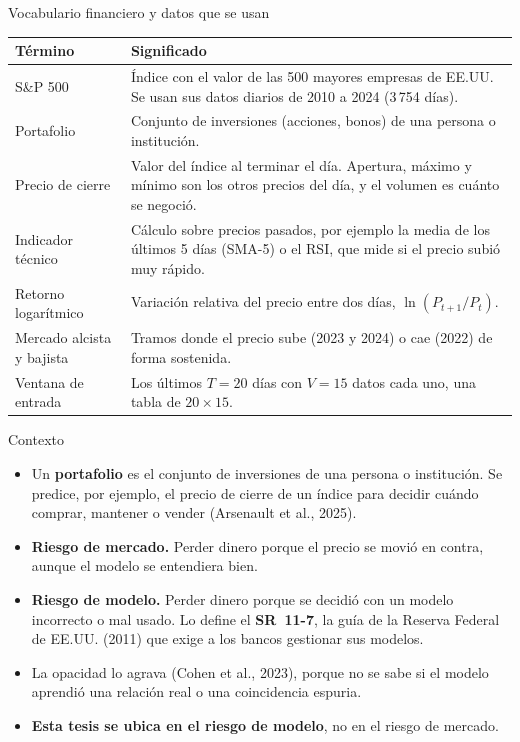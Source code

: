 \documentclass{beamer}
\begin{document}
\begin{frame}{Vocabulario financiero y datos que se usan}
    \footnotesize
    \renewcommand{\arraystretch}{1.15}
    \begin{tabular}{@{}>{\raggedright\arraybackslash}p{3.0cm}>{\raggedright\arraybackslash}p{7.4cm}@{}}
    \toprule
    \textbf{Término} & \textbf{Significado} \\
    \midrule
    S\&P 500 & Índice con el valor de las 500 mayores empresas de EE.UU. Se
    usan sus datos diarios de 2010 a 2024 (3\,754 días). \\
    Portafolio & Conjunto de inversiones (acciones, bonos) de una persona o
    institución. \\
    Precio de cierre & Valor del índice al terminar el día. Apertura, máximo y
    mínimo son los otros precios del día, y el volumen es cuánto se negoció. \\
    Indicador técnico & Cálculo sobre precios pasados, por ejemplo la media de
    los últimos 5 días (SMA-5) o el RSI, que mide si el precio subió muy
    rápido. \\
    Retorno logarítmico & Variación relativa del precio entre dos días,
    $\ln(P_{t+1}/P_t)$. \\
    Mercado alcista y bajista & Tramos donde el precio sube (2023 y 2024) o
    cae (2022) de forma sostenida. \\
    Ventana de entrada & Los últimos $T=20$ días con $V=15$ datos cada uno,
    una tabla de $20\times15$. \\
    \bottomrule
    \end{tabular}
\end{frame}

\begin{frame}{Contexto}
    \begin{itemize}
        \item Un \textbf{portafolio} es el conjunto de inversiones de una
        persona o institución. Se predice, por ejemplo, el precio de cierre
        de un índice para decidir cuándo comprar, mantener o vender
        (Arsenault et al., 2025).
        \vspace{0.2cm}
        \item \textbf{Riesgo de mercado.} Perder dinero porque el precio se
        movió en contra, aunque el modelo se entendiera bien.
        \vspace{0.2cm}
        \item \textbf{Riesgo de modelo.} Perder dinero porque se decidió con
        un modelo incorrecto o mal usado. Lo define el \textbf{SR~11-7}, la
        guía de la Reserva Federal de EE.UU. (2011) que exige a los bancos
        gestionar sus modelos.
        \vspace{0.2cm}
        \item La opacidad lo agrava (Cohen et al., 2023), porque no se
        sabe si el modelo aprendió una relación real o una coincidencia
        espuria.
        \vspace{0.25cm}
        \item \textbf{Esta tesis se ubica en el riesgo de modelo}, no en
        el riesgo de mercado.
    \end{itemize}
\end{frame}
\end{document}
